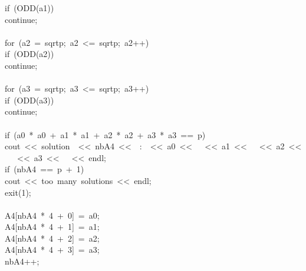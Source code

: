 \begin{tabbing}
\>\>\>if\ (ODD(a1))\ \\[0pt]
\>\>\>\>continue;\\[0pt]
\>\>\>\>\\[0pt]
\>\>\>for\ (a2\ =\ sqrtp;\ a2\ <=\ sqrtp;\ a2++)\ \\[0pt]
\>\>\>\>if\ (ODD(a2))\ \\[0pt]
\>\>\>\>\>continue;\\[0pt]
\>\>\>\>\>\\[0pt]
\>\>\>\>for\ (a3\ =\ sqrtp;\ a3\ <=\ sqrtp;\ a3++)\ \\[0pt]
\>\>\>\>\>if\ (ODD(a3))\ \\[0pt]
\>\>\>\>\>\>continue;\\[0pt]
\>\>\>\>\>\>\\[0pt]
\>\>\>\>\>if\ (a0\ *\ a0\ +\ a1\ *\ a1\ +\ a2\ *\ a2\ +\ a3\ *\ a3\ ==\ p)\ \\[0pt]
\>\>\>\>\>\>cout\ <<\ solution\ \ <<\ nbA4\ <<\ \ :\ \ <<\ a0\ <<\ \ \ <<\ a1\ <<\ \ \ <<\ a2\ <<\ \ \ <<\ a3\ <<\ \ \ <<\ endl;\\[0pt]
\>\>\>\>\>\>if\ (nbA4\ ==\ p\ +\ 1)\ \ \\[0pt]
\>\>\>\>\>\>\>cout\ <<\ too\ many\ solutions\ <<\ endl;\\[0pt]
\>\>\>\>\>\>\>exit(1);\\[0pt]
\>\>\>\>\>\>\>\\[0pt]
\>\>\>\>\>\>A4[nbA4\ *\ 4\ +\ 0]\ =\ a0;\\[0pt]
\>\>\>\>\>\>A4[nbA4\ *\ 4\ +\ 1]\ =\ a1;\\[0pt]
\>\>\>\>\>\>A4[nbA4\ *\ 4\ +\ 2]\ =\ a2;\\[0pt]
\>\>\>\>\>\>A4[nbA4\ *\ 4\ +\ 3]\ =\ a3;\\[0pt]
\>\>\>\>\>\>nbA4++;\\[0pt]
\>\>\>\>\>\>\\[0pt]
\>\>\>\>\>\\[0pt]
\>\>\>\>\\[0pt]
\>\>\>\\[0pt]
\>\>\ \\[0pt]

\end{tabbing}
